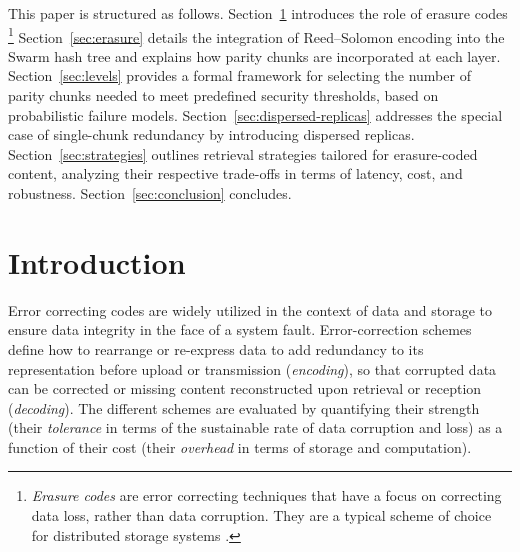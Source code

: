 \documentclass[manuscript,screen,review]{acmart}
\begin{document}

\maketitle


This paper is structured as follows.
Section~\ref{sec:error-correcting-codes} introduces the role of erasure codes%
%
\footnote{\emph{Erasure codes} are error correcting techniques that have a focus on correcting data loss, rather than data corruption. They are a typical scheme of choice for distributed storage systems \citep{balaji2018erasure}.}
%
Section~\ref{sec:erasure} details the integration of Reed–Solomon encoding into the Swarm hash tree and explains how parity chunks are incorporated at each layer.
Section~\ref{sec:levels} provides a formal framework for selecting the number of parity chunks needed to meet predefined security thresholds, based on probabilistic failure models.
Section~\ref{sec:dispersed-replicas} addresses the special case of single-chunk redundancy by introducing dispersed replicas.
Section~\ref{sec:strategies} outlines retrieval strategies tailored for erasure-coded content, analyzing their respective trade-offs in terms of latency, cost, and robustness. Section~\ref{sec:conclusion} concludes.

\section{Introduction} \label{sec:error-correcting-codes}

Error correcting codes are widely utilized in the context of data  and storage to ensure data integrity in the face of a system fault. Error-correction schemes define how to rearrange or re-express data to add redundancy to its representation before upload or transmission (\emph{encoding}), so that corrupted data can be corrected or missing content reconstructed upon retrieval or reception (\emph{decoding}). The different schemes are evaluated by quantifying their strength (their \emph{tolerance} in terms of the sustainable rate of data corruption and loss) as a function of their cost (their \emph{overhead} in terms of storage and computation).
\end{document}
